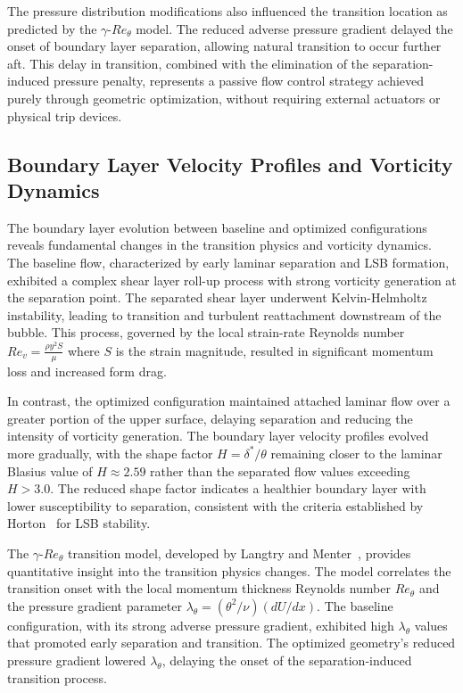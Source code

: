 The pressure distribution modifications also influenced the transition location as predicted by the $\gamma$-$Re_\theta$ model. The reduced adverse pressure gradient delayed the onset of boundary layer separation, allowing natural transition to occur further aft. This delay in transition, combined with the elimination of the separation-induced pressure penalty, represents a passive flow control strategy achieved purely through geometric optimization, without requiring external actuators or physical trip devices.

\subsection{Boundary Layer Velocity Profiles and Vorticity Dynamics}

The boundary layer evolution between baseline and optimized configurations reveals fundamental changes in the transition physics and vorticity dynamics. The baseline flow, characterized by early laminar separation and LSB formation, exhibited a complex shear layer roll-up process with strong vorticity generation at the separation point. The separated shear layer underwent Kelvin-Helmholtz instability, leading to transition and turbulent reattachment downstream of the bubble. This process, governed by the local strain-rate Reynolds number $Re_v = \frac{\rho y^2 S}{\mu}$ where $S$ is the strain magnitude, resulted in significant momentum loss and increased form drag.

In contrast, the optimized configuration maintained attached laminar flow over a greater portion of the upper surface, delaying separation and reducing the intensity of vorticity generation. The boundary layer velocity profiles evolved more gradually, with the shape factor $H = \delta^*/\theta$ remaining closer to the laminar Blasius value of $H \approx 2.59$ rather than the separated flow values exceeding $H > 3.0$. The reduced shape factor indicates a healthier boundary layer with lower susceptibility to separation, consistent with the criteria established by Horton~\cite{horton1968} for LSB stability.

The $\gamma$-$Re_\theta$ transition model, developed by Langtry and Menter~\cite{langtry2009}, provides quantitative insight into the transition physics changes. The model correlates the transition onset with the local momentum thickness Reynolds number $Re_\theta$ and the pressure gradient parameter $\lambda_\theta = (\theta^2/\nu)(dU/dx)$. The baseline configuration, with its strong adverse pressure gradient, exhibited high $\lambda_\theta$ values that promoted early separation and transition. The optimized geometry's reduced pressure gradient lowered $\lambda_\theta$, delaying the onset of the separation-induced transition process.

